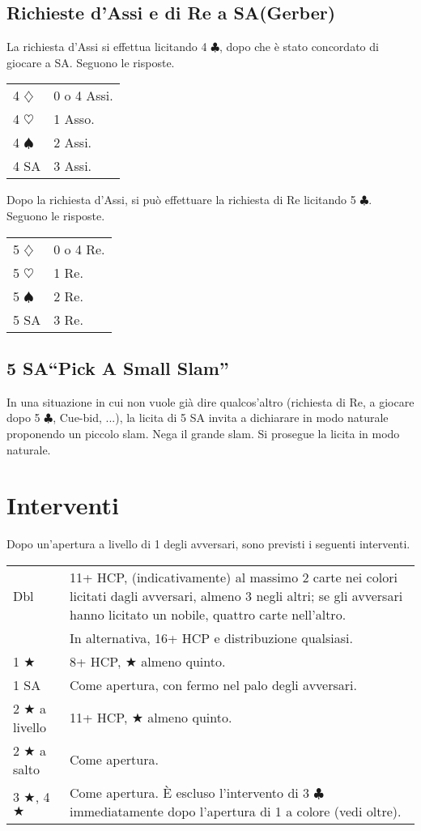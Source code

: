 \documentclass[a4paper,10pt]{article}
\renewcommand{\c}{$\clubsuit$\xspace}
\renewcommand{\d}{$\diamondsuit$\xspace}
\newcommand{\h}{$\heartsuit$\xspace}
\newcommand{\s}{$\spadesuit$\xspace}
\renewcommand{\j}{$\bigstar$\xspace}
\newcommand{\sa}{SA\xspace}
\newcommand{\smallspace}{\vskip0.3cm}
\newenvironment{twocol}
  {\smallspace\noindent\begin{tabular}{l p{0.78\textwidth}}}
  {\end{tabular}\smallspace}
\begin{document}
\subsection{Richieste d'Assi e di Re a \sa (Gerber)}

La richiesta d'Assi si effettua licitando 4 \c, dopo che è stato concordato di giocare a \sa. Seguono le risposte.
\begin{twocol}
  4 \d & 0 o 4 Assi.\\
  4 \h & 1 Asso.\\
  4 \s & 2 Assi.\\
  4 \sa & 3 Assi.
\end{twocol}

\noindent Dopo la richiesta d'Assi, si può effettuare la richiesta di Re licitando 5 \c. Seguono le risposte.
\begin{twocol}
  5 \d & 0 o 4 Re.\\
  5 \h & 1 Re.\\
  5 \s & 2 Re.\\
  5 \sa & 3 Re.
\end{twocol}


\subsection{5 \sa ``Pick A Small Slam''}

In una situazione in cui non vuole già dire qualcos'altro (richiesta di Re, a giocare dopo 5 \c, Cue-bid, ...), la licita di 5 \sa invita a dichiarare in modo naturale proponendo un piccolo slam. Nega il grande slam. Si prosegue la licita in modo naturale.



\pagebreak
\section{Interventi}

Dopo un'apertura a livello di 1 degli avversari, sono previsti i seguenti interventi.

\begin{twocol}
  Dbl & 11+ HCP, (indicativamente) al massimo 2 carte nei colori licitati dagli avversari, almeno 3 negli altri; se gli avversari hanno licitato un nobile, quattro carte nell'altro. \\
  & In alternativa, 16+ HCP e distribuzione qualsiasi.\\
  1 \j & 8+ HCP, \j almeno quinto.\\
  1 \sa & Come apertura, con fermo nel palo degli avversari.\\
  2 \j a livello & 11+ HCP, \j almeno quinto.\\
  2 \j a salto & Come apertura.\\
  3 \j, 4 \j & Come apertura. È escluso l'intervento di 3 \c immediatamente dopo l'apertura di 1 a colore (vedi oltre).
\end{twocol}
\end{document}
